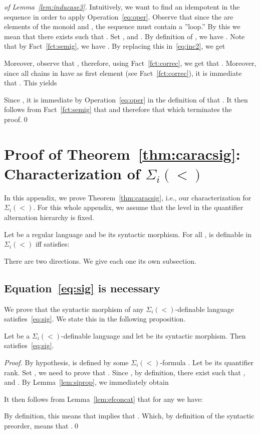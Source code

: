 \documentclass[envcountsame]{llncs}
\newcounter{sauvegarde}
\newcommand\adjustc[1]{\protect{\setcounter{sauvegarde}{\thetheorem}
  \setcounterref{theorem}{#1}
  \addtocounter{theorem}{-1}
}}
\newcommand\restorec{
\setcounter{theorem}{\thesauvegarde}
}
\newcommand{\siw}[1]{\ensuremath{\Sigma_{#1}(<)}\xspace}
\newcommand\chains{chains\xspace}
\begin{document}
\begin{proof}[of Lemma~\ref{lem:inducase3}]
  Intuitively, we want to find an idempotent in the sequence  in order to apply
  Operation~\eqref{eq:oper}. Observe that since the  are elements
  of the monoid  and , the sequence  must contain a ''loop.'' By this we mean that there
  exists  such that . Set ,  and . By definition of , we have . Note that by Fact~\ref{fct:semig}, we have . By replacing this
  in~\eqref{eq:inc2}, we get
  
  Moreover, observe that , therefore, using
  Fact~\ref{fct:correc}, we get that . Moreover, since all \chains in  have 
  as first element (see Fact~\ref{fct:correc}), it is immediate that
  . This
  yields
  
  Since , it is
  immediate by Operation~\eqref{eq:oper} in the definition of 
  that . It then follows from
  Fact~\ref{fct:semig} that  and therefore that  which terminates the proof.\qed
\end{proof}


\section{Proof of Theorem~\ref{thm:caracsig}: Characterization of \siw{i}}
\label{app:sig}
In this appendix, we prove Theorem~\ref{thm:caracsig}, i.e., our
characterization for \siw{i}. For this whole appendix, we assume that
the level  in the quantifier alternation hierarchy is fixed.

\adjustc{thm:caracsig}
\begin{theorem}
  Let  be a regular language and  be its
  syntactic morphism. For all ,  is definable in \siw{i}
  iff  satisfies: 
  
\end{theorem}
\restorec
There are two directions. We give each one its own subsection.

\subsection{Equation~\eqref{eq:sig} is necessary}

We prove that the syntactic morphism of any \siw{i}-definable language
satisfies~\eqref{eq:sig}. We state this in the following proposition.

\begin{proposition} \label{prop:signec}
  Let  be a \siw{i}-definable language and let  be its syntactic morphism. Then 
  satisfies~\eqref{eq:sig}.
\end{proposition}

\begin{proof}
  By hypothesis,  is defined by some \siw{i}-formula . Let  be
  its quantifier rank. Set , we need to prove
  that . Since , by definition, there exist  such that ,  and .  By Lemma~\ref{lem:siprop}, we
  immediately obtain
  
  It then follows from Lemma~\ref{lem:efconcat} that for any 
  we have:
  
  By definition, this means that 
  implies that . Which, by definition of the syntactic preorder, means that .\qed
\end{proof}
\end{document}
